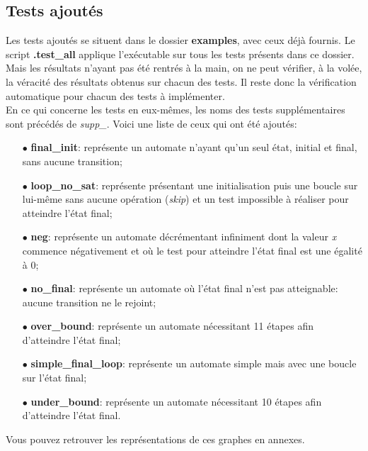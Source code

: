 \subsection{Tests ajoutés}

Les tests ajoutés se situent dans le dossier \textbf{examples}, avec ceux déjà fournis. Le script \textbf{.test\_all} applique l'exécutable sur tous les tests présents dans ce dossier. Mais les résultats n'ayant pas été rentrés à la main, on ne peut vérifier, à la volée, la véracité des résultats obtenus sur chacun des tests. Il reste donc la vérification automatique pour chacun des tests à implémenter.\\

En ce qui concerne les tests en eux-mêmes, les noms des tests supplémentaires sont précédés de \textit{supp\_}.
Voici une liste de ceux qui ont été ajoutés:

\begin{itemize}
\item[$\bullet$]{\textbf{final\_init}: représente un automate n'ayant qu'un seul état, initial et final, sans aucune transition;}
\item[$\bullet$]{\textbf{loop\_no\_sat}: représente présentant une initialisation puis une boucle sur lui-même sans aucune opération (\textit{skip}) et un test impossible à réaliser pour atteindre l'état final;}
\item[$\bullet$]{\textbf{neg}: représente un automate décrémentant infiniment dont la valeur \textit{x} commence négativement et où le test pour atteindre l'état final est une égalité à 0;}
\item[$\bullet$]{\textbf{no\_final}: représente un automate où l'état final n'est pas atteignable: aucune transition ne le rejoint;}
\item[$\bullet$]{\textbf{over\_bound}: représente un automate nécessitant 11 étapes afin d'atteindre l'état final;}
\item[$\bullet$]{\textbf{simple\_final\_loop}: représente un automate simple mais avec une boucle sur l'état final;}
\item[$\bullet$]{\textbf{under\_bound}: représente un automate nécessitant 10 étapes afin d'atteindre l'état final.\\}
\end{itemize}

Vous pouvez retrouver les représentations de ces graphes en annexes.\\

